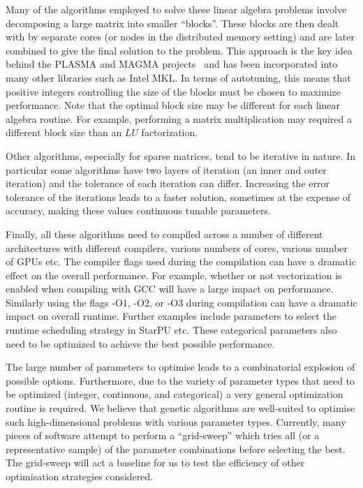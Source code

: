\documentclass[a4paper,12pt]{article}
\begin{document}
Many of the algorithms employed to solve these linear algebra problems
involve decomposing a large matrix into smaller ``blocks''.
These blocks are then dealt with by separate cores
(or nodes in the distributed memory setting)
and are later combined to give the final solution to the problem.
This approach is the key idea behind the
PLASMA and MAGMA projects~\cite{addh09}
and has been incorporated into many other libraries such as Intel MKL.
In terms of autotuning,
this means that positive integers controlling the size of the blocks
must be chosen to maximize performance.
Note that the optimal block size may be different for each linear
algebra routine.
For example, performing a matrix multiplication
may required a different block size than an $LU$ factorization.

Other algorithms,
especially for sparse matrices,
tend to be iterative in nature.
In particular some algorithms have two layers of iteration
(an inner and outer iteration)
and the tolerance of each iteration can differ.
Increasing the error tolerance of the iterations
leads to a faster solution,
sometimes at the expense of accuracy,
making these values continuous tunable parameters.

Finally,
all these algorithms need to compiled across a number of different
architectures with
different compilers, various numbers of cores, various number of GPUs etc.
The compiler flags used during the compilation can have a dramatic
effect on the overall performance.
For example,
whether or not vectorization is enabled when compiling with GCC will
have a large impact on performance.
Similarly using the flags -O1, -O2, or -O3 during compilation can have a
dramatic impact on overall runtime.
Further examples include parameters to select the runtime scheduling
strategy in StarPU etc.
These categorical parameters also need to be optimized to
achieve the best possible performance.

The large number of parameters to optimise leads to a combinatorial
explosion of possible options.
Furthermore,
due to the variety of parameter types that need to be optimized
(integer, continuous, and categorical)
a very general optimization routine is required.
We believe that genetic algorithms are well-suited to optimise
such high-dimensional problems with various parameter types.
Currently,
many pieces of software attempt to perform a ``grid-sweep''
which tries all (or a representative sample)
of the parameter combinations before selecting the best.
The grid-sweep will act a baseline for us to test the efficiency of
other optimisation strategies considered.
\end{document}
